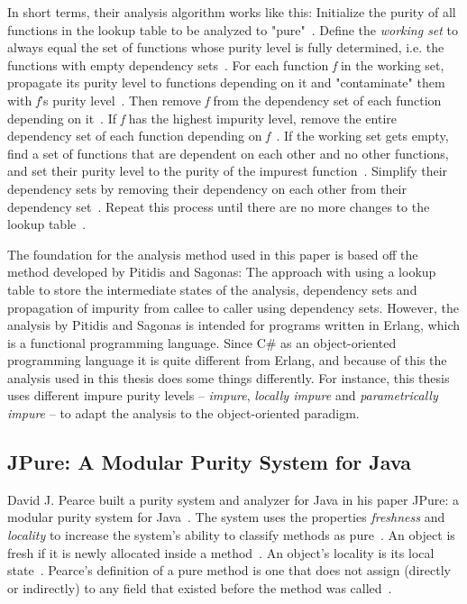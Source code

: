 \documentclass[a4paper,12pt]{article}
\begin{document}
In short terms, their analysis algorithm works like this: Initialize the purity of all functions in the lookup table to be analyzed to "pure"~\cite{pitidis2010purity}. Define the \textit{working set} to always equal the set of functions whose purity level is fully determined, i.e. the functions with empty dependency sets~\cite{pitidis2010purity}. For each function \textit{f} in the working set, propagate its purity level to functions depending on it and "contaminate" them with \textit{f}'s purity level~\cite{pitidis2010purity}. Then remove \textit{f} from the  dependency set of each function depending on it~\cite{pitidis2010purity}. If \textit{f} has the highest impurity level, remove the entire dependency set of each function depending on \textit{f}~\cite{pitidis2010purity}. If the working set gets empty, find a set of functions that are dependent on each other and no other functions, and set their purity level to the purity of the impurest function~\cite{pitidis2010purity}. Simplify their dependency sets by removing their dependency on each other from their dependency set~\cite{pitidis2010purity}. Repeat this process until there are no more changes to the lookup table~\cite{pitidis2010purity}.

The foundation for the analysis method used in this paper is based off the method developed by Pitidis and Sagonas: The approach with using a lookup table to store the intermediate states of the analysis, dependency sets and propagation of impurity from callee to caller using dependency sets. However, the analysis by Pitidis and Sagonas is intended for programs written in Erlang, which is a functional programming language.
Since C\# as an object-oriented programming language it is quite different from Erlang, and because of this the analysis used in this thesis does some things differently. For instance, this thesis uses different impure purity levels -- \textit{impure}, \textit{locally impure} and \textit{parametrically impure} -- to adapt the analysis to the object-oriented paradigm.

\subsection{JPure: A Modular Purity System for Java} \label{sub:JPure: A Modular Purity System for Java}

David J. Pearce built a purity system and analyzer for Java in his paper JPure: a modular purity system for Java~\cite{pearce2011jpure}. The system uses the properties \textit{freshness} and \textit{locality} to increase the system's ability to classify methods as pure~\cite{pearce2011jpure}. An object is fresh if it is newly allocated inside a method~\cite{pearce2011jpure}. An object's locality is its local state~\cite{pearce2011jpure}. Pearce's definition of a pure method is one that does not assign (directly or indirectly) to any field that existed before the method was called~\cite{pearce2011jpure}.
\end{document}
